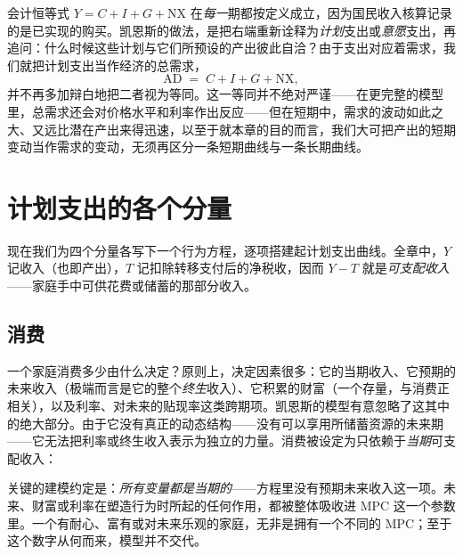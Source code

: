 会计恒等式 $Y = C + I + G + \mathrm{NX}$ 在\emph{每一}期都按定义成立，因为国民收入核算记录的是已实现的购买。凯恩斯的做法，是把右端重新诠释为\emph{计划}支出或\emph{意愿}支出，再追问：什么时候这些计划与它们所预设的产出彼此自洽？由于支出对应着需求，我们就把计划支出当作经济的总需求，
\[
\mathrm{AD} \;=\; C + I + G + \mathrm{NX},
\]
并不再多加辩白地把二者视为等同。这一等同并不绝对严谨——在更完整的模型里，总需求还会对价格水平和利率作出反应——但在短期中，需求的波动如此之大、又远比潜在产出来得迅速，以至于就本章的目的而言，我们大可把产出的短期变动当作需求的变动，无须再区分一条短期曲线与一条长期曲线。

\section{计划支出的各个分量}

现在我们为四个分量各写下一个行为方程，逐项搭建起计划支出曲线。全章中，$Y$ 记收入（也即产出），$T$ 记扣除转移支付后的净税收，因而 $Y - T$ 就是\emph{可支配收入}——家庭手中可供花费或储蓄的那部分收入。

\subsection{消费}

一个家庭消费多少由什么决定？原则上，决定因素很多：它的当期收入、它预期的未来收入（极端而言是它的整个\emph{终生}收入）、它积累的财富（一个存量，与消费正相关），以及利率、对未来的贴现率这类跨期项。凯恩斯的模型有意忽略了这其中的绝大部分。由于它没有真正的动态结构——没有可以享用所储蓄资源的未来期——它无法把利率或终生收入表示为独立的力量。消费被设定为只依赖于\emph{当期}可支配收入：


关键的建模约定是：\emph{所有变量都是当期的}——方程里没有预期未来收入这一项。未来、财富或利率在塑造行为时所起的任何作用，都被整体吸收进 $\mathrm{MPC}$ 这一个参数里。一个有耐心、富有或对未来乐观的家庭，无非是拥有一个不同的 $\mathrm{MPC}$；至于这个数字从何而来，模型并不交代。


